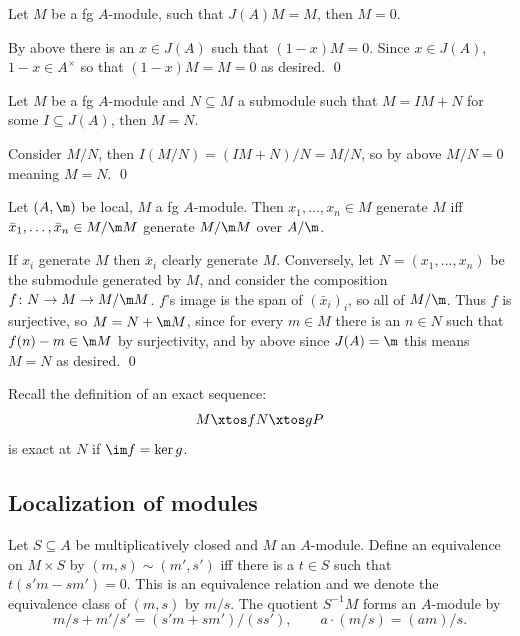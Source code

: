 \eproof

\bcoro[title=Nakayama's lemma]

    Let $M$ be a fg $A$-module, such that $J(A)M=M$, then $M=0$.

\ecoro

\bproof

    By above there is an $x\in J(A)$ such that $(1-x)M=0$.
    Since $x\in J(A)$, $1-x\in A^\times$ so that $(1-x)M=M=0$ as desired.
    \qed

\eproof

\bcoro

    Let $M$ be a fg $A$-module and $N\subseteq M$ a submodule such that $M=IM+N$ for some $I\subseteq J(A)$, then $M=N$.

\ecoro

\bproof

    Consider $M/N$, then $I(M/N)=(IM+N)/N=M/N$, so by above $M/N=0$ meaning $M=N$.
    \qed

\eproof

\bcoro

    Let $(A,\m)$ be local, $M$ a fg $A$-module.
    Then $x_1,\dots,x_n\in M$ generate $M$ iff $\bar x_1,\dots,\bar x_n\in M/\m M$ generate $M/\m M$ over $A/\m$.

\ecoro

\bproof

    If $x_i$ generate $M$ then $\bar x_i$ clearly generate $M$.
    Conversely, let $N=(x_1,\dots,x_n)$ be the submodule generated by $M$, and consider the composition $f\colon N\to M\to M/\m M$.
    $f$'s image is the span of $(\bar x_i)_i$, so all of $M/\m$.
    Thus $f$ is surjective, so $M=N+\m M$, since for every $m\in M$ there is an $n\in N$ such that $f(n)-m\in\m M$ by surjectivity,
    and by above since $J(A)=\m$ this means $M=N$ as desired.
    \qed

\eproof

\bdefn

    Recall the definition of an exact sequence:
    $$ M \xtos fN\xtos gP $$
    is {\emphcolor exact} at $N$ if $\im f=\ker g$.

\edefn

\subsection{Localization of modules}

\bdefn

    Let $S\subseteq A$ be multiplicatively closed and $M$ an $A$-module.
    Define an equivalence on $M\times S$ by $(m,s)\sim(m',s')$ iff there is a $t\in S$ such that $t(s'm-sm')=0$.
    This is an equivalence relation and we denote the equivalence class of $(m,s)$ by $m/s$.
    The quotient $S^{-1}M$ forms an $A$-module by
    $$ m/s + m'/s' = (s'm+sm')/(ss'),\qquad a\cdot(m/s) = (am)/s . $$

